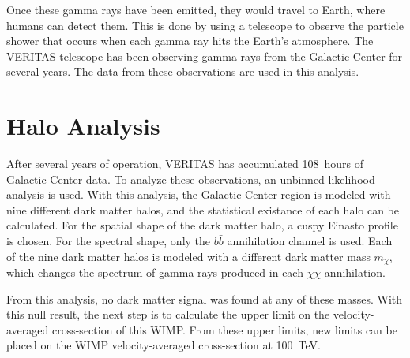   Once these gamma rays have been emitted, they would travel to Earth, where humans can detect them.
  This is done by using a telescope to observe the particle shower that occurs when each gamma ray hits the Earth's atmosphere.
  The VERITAS telescope has been observing gamma rays from the Galactic Center for several years.
  The data from these observations are used in this analysis.


\section{Halo Analysis}
  After several years of operation, VERITAS has accumulated \SI{108}{hours} of Galactic Center data.
  To analyze these observations, an unbinned likelihood analysis is used.
  With this analysis, the Galactic Center region is modeled with nine different dark matter halos, and the statistical existance of each halo can be calculated.
  For the spatial shape of the dark matter halo, a cuspy Einasto profile is chosen.
  For the spectral shape, only the $b\bar{b}$ annihilation channel is used.
  Each of the nine dark matter halos is modeled with a different dark matter mass $m_{\chi}$, which changes the spectrum of gamma rays produced in each $\chi\chi$ annihilation.
  
  From this analysis, no dark matter signal was found at any of these masses.
  With this null result, the next step is to calculate the upper limit on the velocity-averaged cross-section of this WIMP.
  From these upper limits, new limits can be placed on the WIMP velocity-averaged cross-section at \SI{100}{TeV}.


